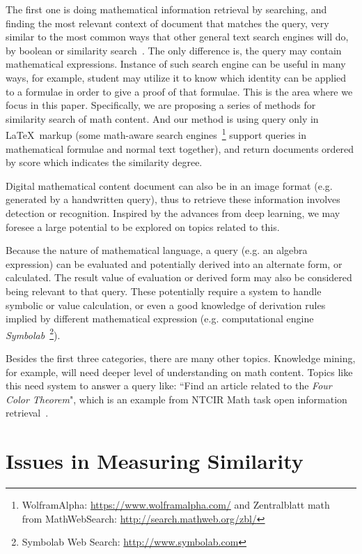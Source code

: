 The first one is doing mathematical information retrieval by searching, and finding the most relevant context of document that matches the query, very similar to the most common ways that other general text search engines will do, by boolean or similarity search~\cite{iir}. 
The only difference is, the query may contain mathematical expressions. 
Instance of such search engine can be useful in many ways, for example, student may utilize it to know which identity can be applied to a formulae in order to give a proof of that formulae.
This is the area where we focus in this paper. Specifically, we are proposing a series of methods for similarity search of math content. And our method is using query only in \LaTeX\ markup 
(some math-aware search engines~\footnote{WolframAlpha: \url{https://www.wolframalpha.com/} and Zentralblatt math \\from MathWebSearch: \url{http://search.mathweb.org/zbl/}} support queries in mathematical formulae and normal text together), and return documents ordered by score which indicates the similarity degree. 

Digital mathematical content document can also be in an image format (e.g. generated by a handwritten query), thus to retrieve these information involves detection or recognition. Inspired by the advances from deep learning, we may foresee a large potential to be explored on topics related to this. 

Because the nature of mathematical language, a query (e.g. an algebra expression) can be evaluated and potentially derived into an alternate form, or calculated. 
The result value of evaluation or derived form may also be considered being relevant to that query. 
These potentially require a system to handle symbolic or value calculation, or even a good knowledge of derivation rules implied by different mathematical expression
(e.g. computational engine \textit{Symbolab}~\footnote{Symbolab Web Search: \url{http://www.symbolab.com}}).

Besides the first three categories, there are many other topics. Knowledge mining, for example, will need deeper level of understanding on math content. Topics like this need system to answer a query like: ``Find an article related to the \textit{Four Color Theorem}", which is an example from NTCIR Math task open information retrieval~\cite{ntcirtopic}.

\section{Issues in Measuring Similarity}
\label{measure_sim}

